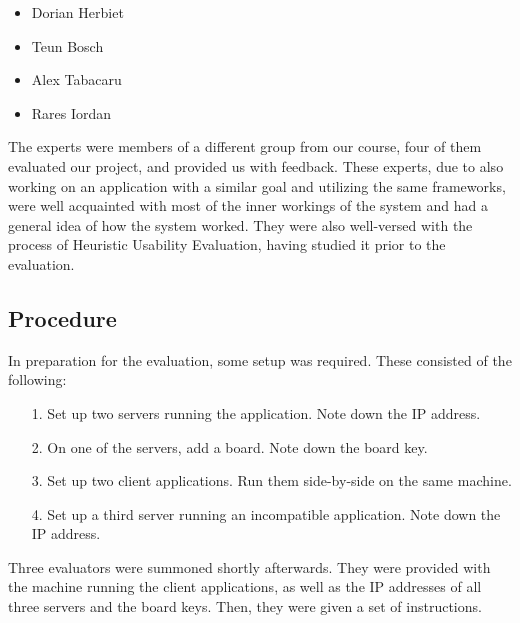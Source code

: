 \begin{itemize}
    \item Dorian Herbiet
    \item Teun Bosch
    \item Alex Tabacaru
    \item Rares Iordan
\end{itemize}

The experts were members of a different group from our course, four of them evaluated our project, and provided us with feedback. These experts, due to also working on an application with a similar goal and utilizing the same frameworks, were well acquainted with most of the inner workings of the system and had a general idea of how the system worked. They were also well-versed with the process of Heuristic Usability Evaluation, having studied it prior to the evaluation. 


\subsection{Procedure}


In preparation for the evaluation, some setup was required. These consisted of the following:
\begin{itemize}
    \item [1.] Set up two servers running the application. Note down the IP address.
    \item [2.] On one of the servers, add a board. Note down the board key.
    \item [3.] Set up two client applications. Run them side-by-side on the same machine.
    \item [4.] Set up a third server running an incompatible application. Note down the IP address.
\end{itemize}

Three evaluators were summoned shortly afterwards. They were provided with the machine running the client applications, as well as the IP addresses of all three servers and the board keys. Then, they were given a set of instructions.


